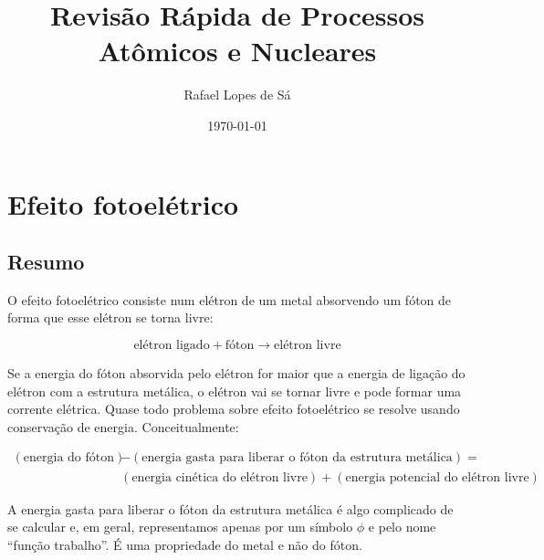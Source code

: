 \documentclass{article}
\title{Revis\~ao R\'apida de Processos At\^omicos e Nucleares}
\author{Rafael Lopes de S\'a}
\date{\today}
\begin{document}
\maketitle

\section{Efeito fotoel\'etrico}

\subsection{Resumo}

O efeito fotoel\'etrico consiste num el\'etron de um metal absorvendo um f\'oton de forma que esse el\'etron se torna livre:

\begin{equation}
\text{el\'etron ligado} + \text{f\'oton} \rightarrow \text{el\'etron livre}
\end{equation}



Se a energia do f\'oton absorvida pelo el\'etron for maior que a energia de liga\c c\~ao do el\'etron com a estrutura met\'alica, o el\'etron vai se tornar livre e pode formar uma corrente el\'etrica. Quase todo problema sobre efeito fotoel\'etrico se resolve usando conserva\c c\~ao de energia. Conceitualmente:

\begin{equation}
\begin{split}
(\text{energia do f\'oton}) &- (\text{energia gasta para liberar o f\'oton da estrutura met\'alica}) = \\
&(\text{energia cin\'etica do el\'etron livre}) + (\text{energia potencial do el\'etron livre})
\end{split}
\end{equation}

A energia gasta para liberar o f\'oton da estrutura met\'alica \'e algo complicado de se calcular e, em geral, representamos apenas por um s\'imbolo $\phi$ e pelo nome ``fun\c c\~ao trabalho''. \'E uma propriedade do metal e n\~ao do f\'oton.
\end{document}
